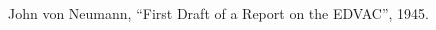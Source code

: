 \begin{thebibliography}{99}

 John von Neumann, ``First Draft of a Report on the EDVAC'', 1945.


\end{thebibliography}
